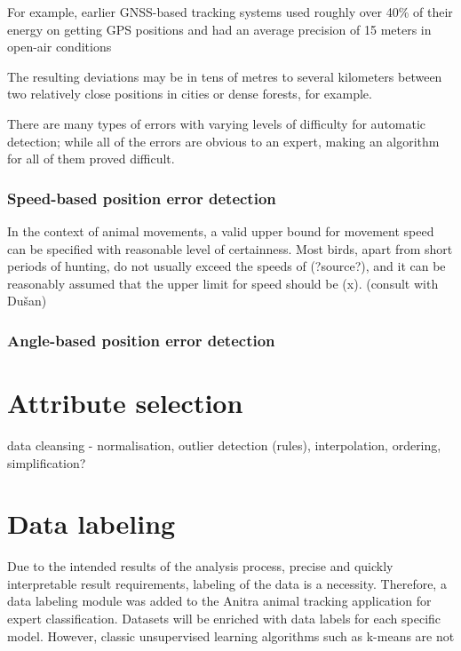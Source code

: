 For example, earlier GNSS-based tracking systems used roughly over 40\% of their energy on getting GPS positions and had an average precision of 15 meters in open-air conditions \cite{jain2008wildcense}

The resulting deviations may be in tens of metres to several kilometers between two relatively close positions in cities or dense forests, for example.

There are many types of errors with varying levels of difficulty for automatic detection; while all of the errors are obvious to an expert, making an algorithm for all of them proved difficult.

\subsubsection{Speed-based position error detection}

In the context of animal movements, a valid upper bound for movement speed can be specified with reasonable level of certainness. Most birds, apart from short periods of hunting, do not usually exceed the speeds of (?source?), and it can be reasonably assumed that the upper limit for speed should be (x). (consult with Dušan)

\subsubsection{Angle-based position error detection}





\section{Attribute selection}

data cleansing - normalisation, outlier detection (rules), interpolation, ordering, simplification?

\section{Data labeling}

Due to the intended results of the analysis process, precise and quickly interpretable result requirements, labeling of the data is a necessity. Therefore, a data labeling module was added to the Anitra animal tracking application for expert classification. Datasets will be enriched with data labels for each specific model. However, classic unsupervised learning algorithms such as k-means are not 

